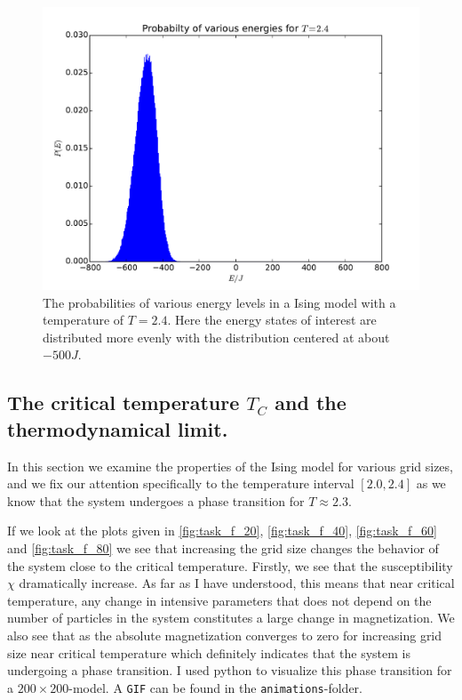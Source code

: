 \begin{figure}
  \centering
  \includegraphics[width=0.8\linewidth]{probability_24.pdf}
  \caption{The probabilities of various energy levels in a Ising model with a
  temperature of $T = 2.4$. Here the energy states of interest are distributed
more evenly with the distribution centered at about $-500J$.}
  \label{fig:probability 24}
\end{figure}

\subsection{The critical temperature $T_C$ and the thermodynamical limit.}

In this section we examine the properties of the Ising model for various grid
sizes, and we fix our attention specifically to the temperature interval
$\left[ 2.0, 2.4 \right]$ as we know that the system undergoes a phase
transition for $T \approx 2.3$.

If we look at the plots given in \cref{fig:task_f_20}, \cref{fig:task_f_40},
\cref{fig:task_f_60} and \cref{fig:task_f_80} we see that increasing the grid
size changes the behavior of the system close to the critical temperature.
Firstly, we see that the susceptibility $\chi$ dramatically increase. As far as
I have understood, this means that near critical temperature, any change in
intensive parameters that does not depend on the number of particles in the
system constitutes a large change in magnetization. We also see that as the
absolute magnetization converges to zero for increasing grid size near critical
temperature which definitely indicates that the system is undergoing a phase
transition. I used python to visualize this phase transition for a
$200\times200$-model. A \texttt{GIF} can be found in the
\texttt{animations}-folder.

